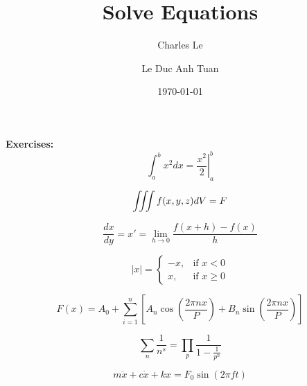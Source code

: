 \documentclass[10pt, a4paper]{article}
\title{Solve Equations}
\author{Charles Le \and Le Duc Anh Tuan}
\date{\today}
\begin{document}
    \maketitle
    
    \textbf{Exercises: }
    \begin{equation}
        \displaystyle \int_a^b x^2 dx = \left.\frac{x^2}{2} \right|_a^b
    \end{equation}
    
    \begin{equation}
        \displaystyle \iiint f(x,y,z) dV = F \\
    \end{equation}
    
    \begin{equation}
        \frac{dx}{dy} = x' = \displaystyle \lim_{h \to 0}\frac{f(x+h)-f(x)}{h}
    \end{equation}
    
    \begin{equation}
        |x| = \begin{cases}
                -x, & \text{if $x < 0$} \\
                x, & \text{if $x \ge 0$}
              \end{cases}
    \end{equation}
    
    \begin{equation}
        F(x) = A_0 + \displaystyle \sum_{i=1}^n\left[A_n\cos(\frac{2\pi nx}{P}) + B_n\sin(\frac{2\pi nx}{P})\right]
    \end{equation}
    
    \begin{equation}
        \displaystyle \sum_{n} \frac{1}{n^s} = \prod_p \frac{1}{1 - \frac{1}{p^n}}
    \end{equation}
    
    \begin{equation}
        m\ddot{x} + c\dot{x} + kx = F_0\sin(2\pi ft)
    \end{equation}
    
\end{document}
